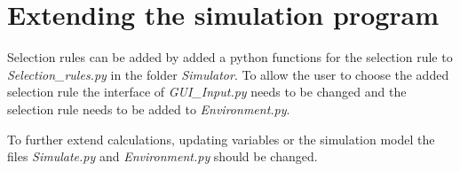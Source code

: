 \documentclass[twoside,openright]{uva-bachelor-thesis}
\begin{document}
\section{Extending the simulation program}
Selection rules can be added by added a python functions for the selection rule to \textit{Selection\_rules.py} in the folder \textit{Simulator}. To allow the user to choose the added selection rule the interface of \textit{GUI\_Input.py} needs to be changed and the selection rule needs to be added to \textit{Environment.py}.

To further extend calculations, updating variables or the simulation model the files \textit{Simulate.py} and \textit{Environment.py} should be changed.
\end{document}
